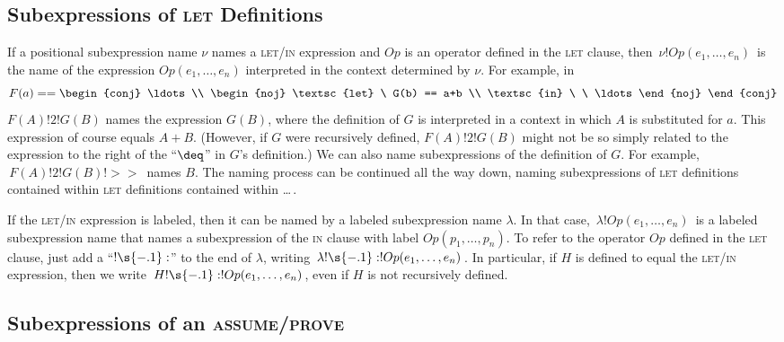 \documentclass[fleqn,leqno]{article}
\newcommand{\bangcolon}{\mbox{$!\s{-.1}:$}}
\begin{document}
\subsection*{Subexpressions of {\rm \textsc{let}} Definitions}

If a positional subexpression name $\nu$ names a \textsc{let}/\textsc{in}
expression and $Op$ is an operator defined in the \textsc{let} clause,
then $\,\nu!Op(e_{1},\ldots, e_{n})\,$ is the name of the expression
$Op(e_{1},\ldots, e_{n})$ interpreted in the context determined by
$\nu$.  For example, in
 \[ F(a) == \begin{conj}
            \ldots \\ 
            \begin{noj}
            \textsc{let} \ G(b) == a+b \\
            \textsc{in} \ \ \ldots
            \end{noj}
            \end{conj}
 \]
$F(A)!2!G(B)$ names the expression $G(B)$, where the definition of $G$
is interpreted in a context in which $A$ is substituted for $a$.  This
expression of course equals $A+B$.  (However, if $G$ were recursively
defined, $F(A)!2!G(B)$ might not be so simply related to the
expression to the right of the ``$\deq$'' in $G$'s definition.)  We
can also name subexpressions of the definition of $G$.  For example,
$\,F(A)!2!G(B)!>>\,$ names $B$.  The naming process can be continued all
the way down, naming subexpressions of \textsc{let} definitions
contained within \textsc{let} definitions contained within \ldots\,.

\begin{sloppypar}
If the \textsc{let}/\textsc{in} expression is labeled, then it can be
named by a labeled subexpression name $\lambda$.  In that case,
$\,\lambda!Op(e_{1},\ldots, e_{n})\,$ is a labeled subexpression name that
names a subexpression of the \textsc{in} clause with label
$Op(p_{1},\ldots, p_{n})$.  To refer to the operator $Op$ defined in
the \textsc{let} clause, just add a ``$\bangcolon$'' to the end of $\lambda$,
writing $\,\lambda\bangcolon!Op(e_{1},\ldots, e_{n})\,$.  In particular, if
$H$ is defined to equal the \textsc{let}/\textsc{in} expression,
then we write $\,H\bangcolon!Op(e_{1},\ldots, e_{n})\,$, even if
$H$ is not recursively defined.
\end{sloppypar}


\subsection*{Subexpressions of an {\rm \textsc{assume}/\textsc{prove}}}
\label{sec:subexpr-assume-prove}
\end{document}
